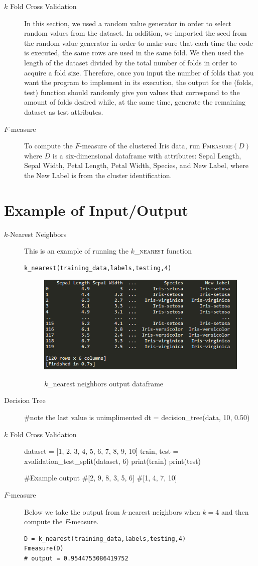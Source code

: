 \documentclass[psamsfonts,onesided,10pt]{amsart}
\begin{document}
\begin{description}
\item[$k$ Fold Cross Validation] In this section, we used a random value generator in order to select random values from the dataset. In addition, we imported the seed from the random value generator in order to make sure that each time the code is executed, the same rows are used in the same fold. We then used the length of the dataset divided by the total number of folds in order to acquire a fold size.  Therefore, once you input the number of folds that you want the program to implement in its execution, the output for the (folds, test) function should randomly give you values that correspond to the amount of folds desired while, at the same time, generate the remaining dataset as test attributes.
\item[$F$-measure] To compute the $F$-measure of the clustered Iris data, run \textsc{Fmeasure}$(D)$ 
where $D$ is a six-dimensional dataframe with attributes: Sepal Length, Sepal Width, Petal Length, Petal Width,
              Species, and New Label, where the New Label is from the cluster identification. 
\end{description}
 
\section{Example of Input/Output}
\begin{description}
\item[$k$-Nearest Neighbors] This is an example of running the \textsc{$k$\_nearest} function
\begin{verbatim}
k_nearest(training_data,labels,testing,4)
\end{verbatim}
	\begin{figure}[H]
    	\centering
    	{\includegraphics[width=.4\textwidth]{images/knearest.PNG}} 
   	 \caption{$k$\_nearest neighbors output dataframe}
	\end{figure}
	

\item[Decision Tree]
                        #note the last value is unimplimented
dt = decision_tree(data, 10, 0.50)

\item[$k$ Fold Cross Validation]
dataset = [1, 2, 3, 4, 5, 6, 7, 8, 9, 10]
train, test = xvalidation_test_split(dataset, 6)
print(train)
print(test)

#Example output
#[2, 9, 8, 3, 5, 6]
#[1, 4, 7, 10]

\item[$F$-measure] Below we take the output from $k$-nearest neighbors when $k=4$ and then compute the $F$-measure. 
\begin{verbatim}
D = k_nearest(training_data,labels,testing,4)
Fmeasure(D)
# output = 0.9544753086419752
\end{verbatim}
\end{description}
\end{document}
